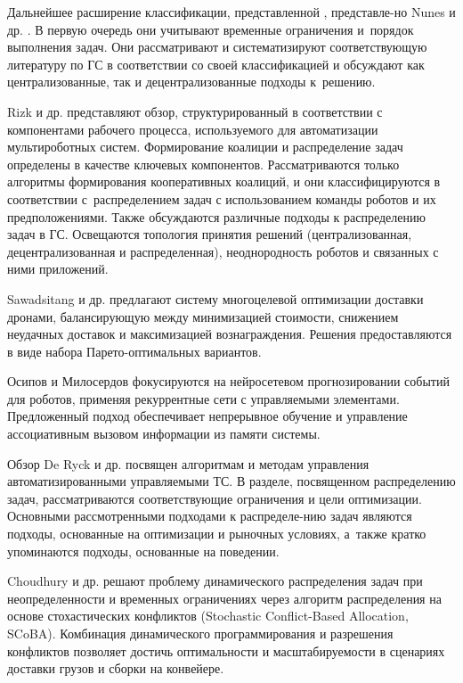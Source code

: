 Дальнейшее расширение классификации, представленной \cite{gerkey2004formal}, представле-но Nunes и др. \cite{nunes2017taxonomy}. В первую очередь они учитывают временные ограничения и~порядок выполнения задач. Они рассматривают и систематизируют соответствующую литературу по ГС в соответствии со своей классификацией и обсуждают как централизованные, так и децентрализованные подходы к~решению.

Rizk и др. \cite{rizk2019cooperative} представляют обзор, структурированный в соответствии с компонентами рабочего процесса, используемого для автоматизации мультироботных систем. Формирование коалиции и распределение задач определены в качестве ключевых компонентов. Рассматриваются только алгоритмы формирования кооперативных коалиций, и они классифицируются в соответствии с~распределением задач с использованием команды роботов и их предположениями. Также обсуждаются различные подходы к распределению задач в ГС. Освещаются топология принятия решений (централизованная, децентрализованная и распределенная), неоднородность роботов и связанных с ними приложений.

Sawadsitang и др. \cite{sawadsitang2019multiobjectiveoptimizationdronedelivery} предлагают систему многоцелевой оптимизации доставки дронами, балансирующую между минимизацией стоимости, снижением неудачных доставок и максимизацией вознаграждения. Решения предоставляются в виде набора Парето-оптимальных вариантов.

Осипов и Милосердов \cite{OsipovMiloserdov2020} фокусируются на нейросетевом прогнозировании событий для роботов, применяя рекуррентные сети с управляемыми элементами. Предложенный подход обеспечивает непрерывное обучение и управление ассоциативным вызовом информации из памяти системы.

Обзор De Ryck и др. \cite{de2020automated} посвящен алгоритмам и методам управления автоматизированными управляемыми ТС. В разделе, посвященном распределению задач, рассматриваются соответствующие ограничения и цели оптимизации. Основными рассмотренными подходами к распределе-нию задач являются подходы, основанные на оптимизации и рыночных условиях, а~также кратко упоминаются подходы, основанные на поведении.

Choudhury и др. \cite{choudhury2020dynamicmultirobottaskallocation} решают проблему динамического распределения задач при неопределенности и временных ограничениях через алгоритм распределения на основе стохастических конфликтов (Stochastic Conflict-Based Allocation, SCoBA). Комбинация динамического программирования и разрешения конфликтов позволяет достичь оптимальности и масштабируемости в сценариях доставки грузов и сборки на конвейере.

